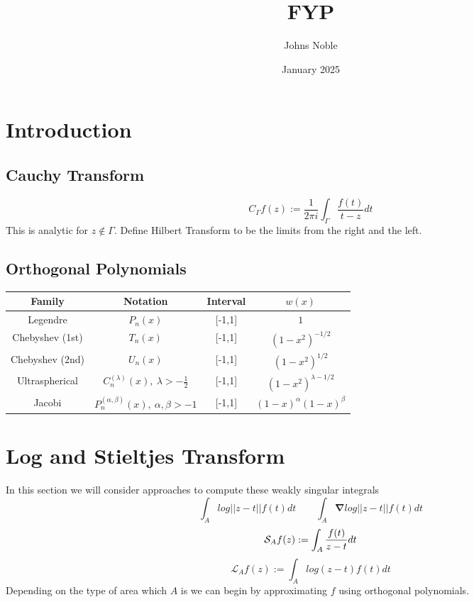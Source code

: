 \documentclass{article}
\title{FYP}
\author{Johns Noble}
\date{January 2025}
\begin{document}
\maketitle

\newpage
\tableofcontents
\newpage

\section{Introduction}
\subsection{Cauchy Transform}
\begin{equation} \label{cauchy transform}
C_\Gamma f(z):=\frac{1}{2\pi i}\int_\Gamma \frac{f(t)}{t-z}dt
\end{equation}
This is analytic for $z \not\in \Gamma$. Define Hilbert Transform to be the limits from the right and the left.
\subsection{Orthogonal Polynomials}
\begin{center}
\begin{tabular}{ |c|c|c|c| } 
 \hline
	Family & Notation & Interval & $w(x)$ \\ 
 \hline
	Legendre & $P_n(x)$ & [-1,1] & $1$ \\ 
	Chebyshev (1st) & $T_n(x)$ & [-1,1] & $(1-x^2)^{-1/2}$ \\ 
	Chebyshev (2nd) & $U_n(x)$ & [-1,1] & $(1-x^2)^{1/2}$ \\
	Ultraspherical & $C_n^{(\lambda)}(x),\:\lambda>-\frac{1}{2}$ & [-1,1] & $(1-x^2)^{\lambda-1/2}$ \\
	Jacobi & $P_n^{(\alpha,\beta)}(x),\:\alpha,\beta>-1$ & [-1,1] & $(1-x)^\alpha(1-x)^\beta$ \\
 \hline
\end{tabular}
\end{center}
\section{Log and Stieltjes Transform}
In this section we will consider approaches to compute these weakly singular integrals
$$ \int_Alog||z-t||f(t)dt \qquad \int_A\mathbf{\nabla}log||z-t||f(t)dt $$
\begin{equation}\label{stieltjes transform}
	\mathcal{S}_Af(z):= \int_A\frac{f(t)}{z-t}dt \\
\end{equation}
\begin{equation}\label{log transform}
	\mathcal{L}_Af(z):= \int_Alog(z-t)f(t)dt
\end{equation}
Depending on the type of area which $A$ is we can begin by approximating $f$ using orthogonal polynomials.
\end{document}

